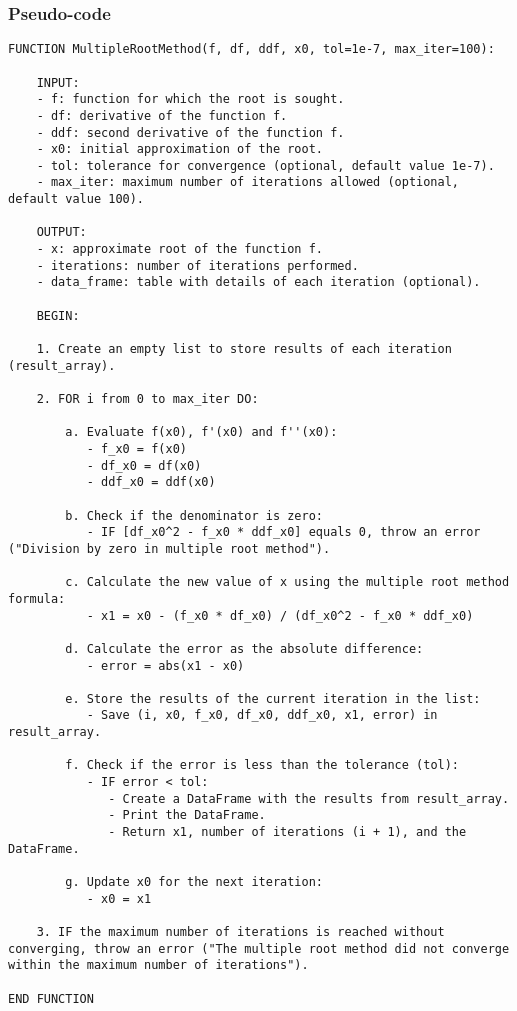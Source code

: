 \documentclass{article}
\begin{document}
        \subsubsection{Pseudo-code}
\begin{lstlisting}
FUNCTION MultipleRootMethod(f, df, ddf, x0, tol=1e-7, max_iter=100):

    INPUT:
    - f: function for which the root is sought.
    - df: derivative of the function f.
    - ddf: second derivative of the function f.
    - x0: initial approximation of the root.
    - tol: tolerance for convergence (optional, default value 1e-7).
    - max_iter: maximum number of iterations allowed (optional, default value 100).

    OUTPUT:
    - x: approximate root of the function f.
    - iterations: number of iterations performed.
    - data_frame: table with details of each iteration (optional).

    BEGIN:

    1. Create an empty list to store results of each iteration (result_array).

    2. FOR i from 0 to max_iter DO:

        a. Evaluate f(x0), f'(x0) and f''(x0):
           - f_x0 = f(x0)
           - df_x0 = df(x0)
           - ddf_x0 = ddf(x0)

        b. Check if the denominator is zero:
           - IF [df_x0^2 - f_x0 * ddf_x0] equals 0, throw an error ("Division by zero in multiple root method").

        c. Calculate the new value of x using the multiple root method formula:
           - x1 = x0 - (f_x0 * df_x0) / (df_x0^2 - f_x0 * ddf_x0)

        d. Calculate the error as the absolute difference:
           - error = abs(x1 - x0)

        e. Store the results of the current iteration in the list:
           - Save (i, x0, f_x0, df_x0, ddf_x0, x1, error) in result_array.

        f. Check if the error is less than the tolerance (tol):
           - IF error < tol:
              - Create a DataFrame with the results from result_array.
              - Print the DataFrame.
              - Return x1, number of iterations (i + 1), and the DataFrame.

        g. Update x0 for the next iteration:
           - x0 = x1

    3. IF the maximum number of iterations is reached without converging, throw an error ("The multiple root method did not converge within the maximum number of iterations").

END FUNCTION
\end{lstlisting}
\end{document}
